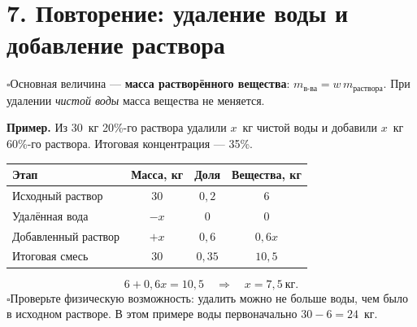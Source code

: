 \documentclass[a4paper,12pt]{article}
\newcommand{\checkitem}[1]{\noindent\(\square\)\enspace #1\par}
\newcommand{\keyterm}[1]{{\color{darkaccent}\textbf{#1}}}
\newcommand{\smallrule}{\par\vspace{.15em}{\color{lightline}\rule{\linewidth}{.35pt}}\vspace{.15em}}
\begin{document}
\smallrule
\section*{7. Повторение: удаление воды и добавление раствора}
\checkitem{Основная величина --- \keyterm{масса растворённого вещества}: \(m_{\text{в-ва}}=w\,m_{\text{раствора}}\). При удалении \emph{чистой воды} масса вещества не меняется.}
\textbf{Пример.} Из 30~кг 20\%-го раствора удалили \(x\)~кг чистой воды и добавили \(x\)~кг 60\%-го раствора. Итоговая концентрация --- 35\%.
\begin{center}
\renewcommand{\arraystretch}{1.2}
\begin{tabularx}{\linewidth}{@{}Xccc@{}}
\toprule
\textbf{Этап} & \textbf{Масса, кг} & \textbf{Доля} & \textbf{Вещества, кг}\\
\midrule
Исходный раствор & \(30\) & \(0{,}2\) & \(6\)\\
Удалённая вода & \(-x\) & \(0\) & \(0\)\\
Добавленный раствор & \(+x\) & \(0{,}6\) & \(0{,}6x\)\\
Итоговая смесь & \(30\) & \(0{,}35\) & \(10{,}5\)\\
\bottomrule
\end{tabularx}
\end{center}
\[
6+0{,}6x=10{,}5\quad\Longrightarrow\quad \boxed{x=7{,}5\ \text{кг}.}
\]
\checkitem{Проверьте физическую возможность: удалить можно не больше воды, чем было в исходном растворе. В этом примере воды первоначально \(30-6=24\)~кг.}
\end{document}
